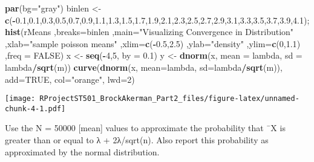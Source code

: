 \documentclass[
]{article}
\newenvironment{Shaded}{\begin{snugshade}}{\end{snugshade}}
\newcommand{\DataTypeTok}[1]{\textcolor[rgb]{0.13,0.29,0.53}{#1}}
\newcommand{\DecValTok}[1]{\textcolor[rgb]{0.00,0.00,0.81}{#1}}
\newcommand{\FloatTok}[1]{\textcolor[rgb]{0.00,0.00,0.81}{#1}}
\newcommand{\KeywordTok}[1]{\textcolor[rgb]{0.13,0.29,0.53}{\textbf{#1}}}
\newcommand{\NormalTok}[1]{#1}
\newcommand{\OperatorTok}[1]{\textcolor[rgb]{0.81,0.36,0.00}{\textbf{#1}}}
\newcommand{\OtherTok}[1]{\textcolor[rgb]{0.56,0.35,0.01}{#1}}
\newcommand{\StringTok}[1]{\textcolor[rgb]{0.31,0.60,0.02}{#1}}
\begin{document}
\begin{Shaded}
\begin{Highlighting}[]
\KeywordTok{par}\NormalTok{(}\DataTypeTok{bg=}\StringTok{"gray"}\NormalTok{)}
\NormalTok{binlen <-}\StringTok{ }\KeywordTok{c}\NormalTok{(}\OperatorTok{-}\FloatTok{0.1}\NormalTok{,}\FloatTok{0.1}\NormalTok{,}\FloatTok{0.3}\NormalTok{,}\FloatTok{0.5}\NormalTok{,}\FloatTok{0.7}\NormalTok{,}\FloatTok{0.9}\NormalTok{,}\FloatTok{1.1}\NormalTok{,}\FloatTok{1.3}\NormalTok{,}\FloatTok{1.5}\NormalTok{,}\FloatTok{1.7}\NormalTok{,}\FloatTok{1.9}\NormalTok{,}\FloatTok{2.1}\NormalTok{,}\FloatTok{2.3}\NormalTok{,}\FloatTok{2.5}\NormalTok{,}\FloatTok{2.7}\NormalTok{,}\FloatTok{2.9}\NormalTok{,}\FloatTok{3.1}\NormalTok{,}\FloatTok{3.3}\NormalTok{,}\FloatTok{3.5}\NormalTok{,}\FloatTok{3.7}\NormalTok{,}\FloatTok{3.9}\NormalTok{,}\FloatTok{4.1}\NormalTok{);}
\KeywordTok{hist}\NormalTok{(rMeans ,}\DataTypeTok{breaks=}\NormalTok{binlen ,}\DataTypeTok{main=}\StringTok{"Visualizing Convergence in Distribution"}\NormalTok{ ,}\DataTypeTok{xlab=}\StringTok{"sample poisson means"}\NormalTok{ ,}\DataTypeTok{xlim=}\KeywordTok{c}\NormalTok{(}\OperatorTok{-}\FloatTok{0.5}\NormalTok{,}\FloatTok{2.5}\NormalTok{) ,}\DataTypeTok{ylab=}\StringTok{"density"}\NormalTok{ ,}\DataTypeTok{ylim=}\KeywordTok{c}\NormalTok{(}\DecValTok{0}\NormalTok{,}\FloatTok{1.1}\NormalTok{) ,}\DataTypeTok{freq =} \OtherTok{FALSE}\NormalTok{)}
\NormalTok{x <-}\StringTok{ }\KeywordTok{seq}\NormalTok{(}\OperatorTok{-}\DecValTok{4}\NormalTok{,}\DecValTok{5}\NormalTok{, }\DataTypeTok{by =} \FloatTok{0.1}\NormalTok{)}
\NormalTok{y <-}\StringTok{ }\KeywordTok{dnorm}\NormalTok{(x, }\DataTypeTok{mean =}\NormalTok{ lambda, }\DataTypeTok{sd =}\NormalTok{ lambda}\OperatorTok{/}\KeywordTok{sqrt}\NormalTok{(m))}
\KeywordTok{curve}\NormalTok{(}\KeywordTok{dnorm}\NormalTok{(x, }\DataTypeTok{mean=}\NormalTok{lambda, }\DataTypeTok{sd=}\NormalTok{lambda}\OperatorTok{/}\KeywordTok{sqrt}\NormalTok{(m)), }\DataTypeTok{add=}\OtherTok{TRUE}\NormalTok{, }\DataTypeTok{col=}\StringTok{"orange"}\NormalTok{, }\DataTypeTok{lwd=}\DecValTok{2}\NormalTok{)}
\end{Highlighting}
\end{Shaded}

\texttt{[image: RProjectST501\_BrockAkerman\_Part2\_files/figure-latex/unnamed-chunk-4-1.pdf]}

Use the N = 50000 {[}mean{]} values to approximate the probability that
¯X is greater than or equal to λ + 2λ/sqrt(n). Also report this
probability as approximated by the normal distribution.
\end{document}

